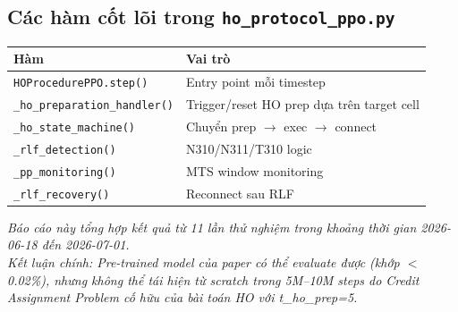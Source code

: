 \documentclass[11pt]{article}
\begin{document}
\subsection*{Các hàm cốt lõi trong \texttt{ho\_protocol\_ppo.py}}

\begin{longtable}{@{}lp{9cm}@{}}
\toprule
\textbf{Hàm} & \textbf{Vai trò} \\
\midrule
\endhead
\texttt{HOProcedurePPO.step()} & Entry point mỗi timestep \\
\texttt{\_ho\_preparation\_handler()} & Trigger/reset HO prep dựa trên target cell \\
\texttt{\_ho\_state\_machine()} & Chuyển prep $\to$ exec $\to$ connect \\
\texttt{\_rlf\_detection()} & N310/N311/T310 logic \\
\texttt{\_pp\_monitoring()} & MTS window monitoring \\
\texttt{\_rlf\_recovery()} & Reconnect sau RLF \\
\bottomrule
\end{longtable}

\bigskip
\textit{Báo cáo này tổng hợp kết quả từ 11 lần thử nghiệm trong khoảng thời gian 2026-06-18 đến 2026-07-01.}\\
\textit{Kết luận chính: Pre-trained model của paper có thể evaluate được (khớp $<$ 0.02\%), nhưng không thể tái hiện từ scratch trong 5M--10M steps do Credit Assignment Problem cố hữu của bài toán HO với t\_ho\_prep=5.}
\end{document}
